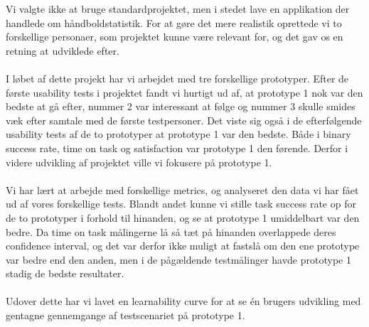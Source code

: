 Vi valgte ikke at bruge standardprojektet, men i stedet lave en applikation der handlede om håndboldstatistik. For at gøre det mere realistik oprettede vi to forskellige personaer, som projektet kunne være relevant for, og det gav os en retning at udviklede efter.\\\\I løbet af dette projekt har vi arbejdet med tre forskellige prototyper. Efter de første usability tests i projektet fandt vi hurtigt ud af, at prototype 1 nok var den bedste at gå efter, nummer 2 var interessant at følge og nummer 3 skulle smides væk efter samtale med de første testpersoner. Det viste sig også i de efterfølgende usability tests af de to prototyper at prototype 1 var den bedste. Både i binary success rate, time on task og satisfaction var prototype 1 den førende. Derfor i videre udvikling af projektet ville vi fokusere på prototype 1.\\\\Vi har lært at arbejde med forskellige metrics, og analyseret den data vi har fået ud af vores forskellige tests. Blandt andet kunne vi stille task success rate op for de to prototyper i forhold til hinanden, og se at prototype 1 umiddelbart var den bedre. Da time on task målingerne lå så tæt på hinanden overlappede deres confidence interval, og det var derfor ikke muligt at fastslå om den ene prototype var bedre end den anden, men i de pågældende testmålinger havde prototype 1 stadig de bedste resultater.\\\\Udover dette har vi lavet en learnability curve for at se én brugers udvikling med gentagne gennemgange af testscenariet på prototype 1. 